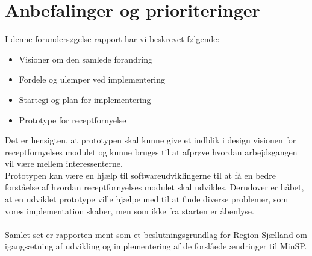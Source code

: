 \section{Anbefalinger og prioriteringer}
I denne forundersøgelse rapport har vi beskrevet følgende:
\begin{itemize}
	\item Visioner om den samlede forandring
	\item Fordele og ulemper ved implementering
	\item Startegi og plan for implementering
	\item Prototype for receptfornyelse
\end{itemize}
Det er hensigten, at prototypen skal kunne give et indblik i design visionen for receptfornyelses modulet og kunne bruges til at afprøve hvordan arbejdsgangen vil være mellem interessenterne.\\
Prototypen kan være en hjælp til softwareudviklingerne til at få en bedre forståelse af hvordan receptfornyelses modulet skal udvikles. Derudover er håbet, at en udviklet prototype ville hjælpe med til at finde diverse problemer, som vores implementation skaber, men som ikke fra starten er åbenlyse. \\\\
Samlet set er rapporten ment som et beslutningsgrundlag for Region Sjælland om igangsætning af udvikling og implementering af de forslåede ændringer til MinSP.
